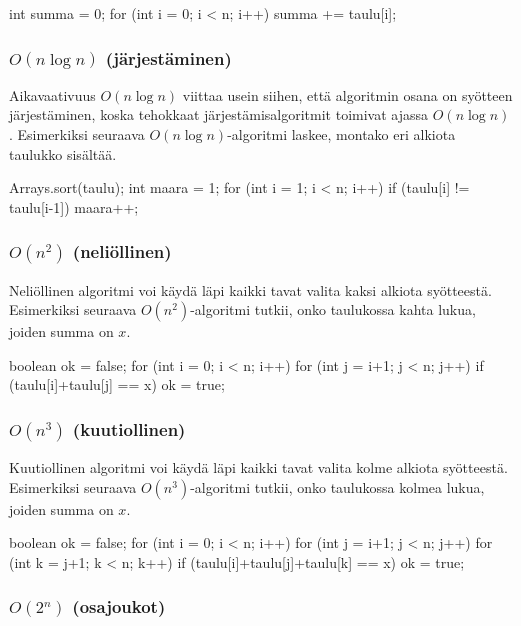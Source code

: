 \begin{code}
int summa = 0;
for (int i = 0; i < n; i++) {
    summa += taulu[i];
}
\end{code}

\subsubsection{$O(n \log n)$ (järjestäminen)}

Aikavaativuus $O(n \log n)$ viittaa usein siihen,
että algoritmin osana on syöt\-teen järjestäminen,
koska tehokkaat järjestämisalgoritmit
toimivat ajassa $O(n \log n)$.
Esimerkiksi seuraava $O(n \log n)$-algoritmi laskee,
montako eri alkiota taulukko sisältää.

\begin{code}
Arrays.sort(taulu);
int maara = 1;
for (int i = 1; i < n; i++) {
    if (taulu[i] != taulu[i-1]) maara++;
}
\end{code}

\subsubsection{$O(n^2)$ (neliöllinen)}

Neliöllinen algoritmi voi käydä läpi kaikki tavat valita
kaksi alkiota syötteestä.
Esimerkiksi seuraava $O(n^2)$-algoritmi tutkii, onko taulukossa
kahta lukua, joiden summa on $x$.

\begin{code}
boolean ok = false;
for (int i = 0; i < n; i++) {
    for (int j = i+1; j < n; j++) {
        if (taulu[i]+taulu[j] == x) ok = true;
    }
}
\end{code}

\subsubsection{$O(n^3)$ (kuutiollinen)}

Kuutiollinen algoritmi voi käydä läpi kaikki tavat valita
kolme alkiota syötteestä.
Esimerkiksi seuraava $O(n^3)$-algoritmi tutkii, onko taulukossa
kolmea lukua, joiden summa on $x$.

\begin{code}
boolean ok = false;
for (int i = 0; i < n; i++) {
    for (int j = i+1; j < n; j++) {
        for (int k = j+1; k < n; k++) {
            if (taulu[i]+taulu[j]+taulu[k] == x) ok = true;
        }
    }
}
\end{code}

\subsubsection{$O(2^n)$ (osajoukot)}

